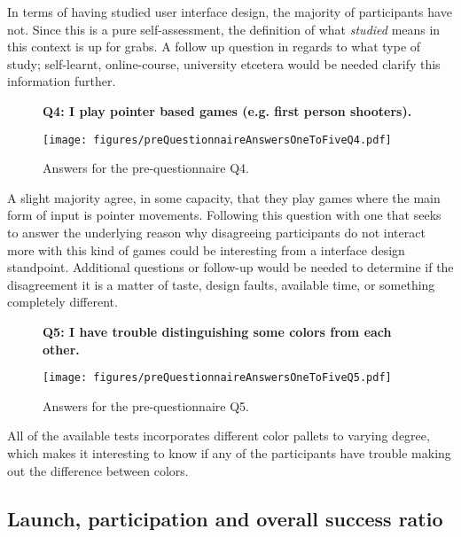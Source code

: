     In terms of having studied user interface design, the majority of
    participants have not. Since this is a pure self-assessment, the
    definition of what \textit{studied} means in this context is up for
    grabs. A follow up question in regards to what type of study;
    self-learnt, online-course, university etcetera would be needed clarify
    this information further.

    \newpage
    \begin{figure}[h!]
      \textbf{Q4: I play pointer based games (e.g. first person shooters).}
      \begin{center}
        \texttt{[image: figures/preQuestionnaireAnswersOneToFiveQ4.pdf]}
        \vspace{-1cm}
        \caption{Answers for the pre-questionnaire Q4.}
      \end{center}
    \end{figure}

    A slight majority agree, in some capacity, that they play games where
    the main form of input is pointer movements. Following this question
    with one that seeks to answer the underlying reason why disagreeing
    participants do not interact more with this kind of games could be
    interesting from a interface design standpoint. Additional questions or
    follow-up would be needed to determine if the disagreement it is a
    matter of taste, design faults, available time, or something completely
    different.

    \begin{figure}[h!]
      \textbf{Q5: I have trouble distinguishing some colors from each other.}
      \begin{center}
        \texttt{[image: figures/preQuestionnaireAnswersOneToFiveQ5.pdf]}
        \vspace{-1cm}
        \caption{Answers for the pre-questionnaire Q5.}
        \vspace{-0.4cm}
      \end{center}
    \end{figure}

    All of the available tests incorporates different color pallets to
    varying degree, which makes it interesting to know if any of the
    participants have trouble making out the difference between colors.
    \vspace{-0.6cm}

  \newpage
  \subsection{Launch, participation and overall success ratio}

